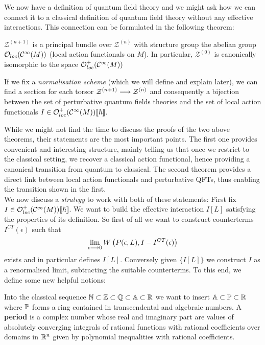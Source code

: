 We now have a definition of quantum field theory and we might ask how we can connect it to a classical definition of quantum field theory without any effective interactions. This connection can be formulated in the following theorem:

\begin{theo}
  $\mathcal{Z}^{(n+1)}$ is a principal bundle over $\mathcal{Z}^{(n)}$ with structure group the abelian group $\mathcal{O}_{loc}(\mathcal{C}^{\infty}(M))$ (local action functionals on $M$). In particular, $\mathcal{Z}^{(0)}$ is canonically isomorphic to the space $\mathcal{O}^+_{loc}(\mathcal{C}^{\infty}(M))$
\end{theo}

\begin{theo}
  If we fix a \emph{normalisation scheme} (which we will define and explain later), we can find a section for each torsor $\mathcal{Z}^{(n+1)} \longrightarrow \mathcal{Z}^{(n)}$ and consequently a bijection between the set of perturbative quantum fields theories and the set of local action functionals $I \in \mathcal{O}^+_{loc}(\mathcal{C}^{\infty}(M))\llbracket \hbar \rrbracket$.
\end{theo}

While we might not find the time to discuss the proofs of the two above theorems, their statements are the most important points. The first one provides convenient and interesting structure, mainly telling us that once we restrict to the classical setting, we recover a classical action functional, hence providing a canonical transition from quantum to classical. The second theorem provides a direct link between local action functionals and perturbative QFTs, thus enabling the transition shown in the first.\\

We now discuss a \textit{strategy} to work with both of these statements: First fix $I \in \mathcal{O}^+_{loc}(\mathcal{C}^{\infty}(M))\llbracket \hbar \rrbracket$. We want to build the effective interaction $I[L]$ satisfying the properties of its definition. So first of all we want to construct counterterms $I^{CT}(\epsilon)$ such that
\begin{equation} \lim_{\epsilon \lra 0} W\left(P(\epsilon,L), I-I^{CT}(\epsilon)\right)\end{equation}
exists and in particular defines $I[L]$. Conversely given $\{I[L]\}$ we construct $I$ as a renormalised limit, subtracting the suitable counterterms. To this end, we define some new helpful notions:

\begin{definition}[Periods]
  Into the classical sequence $\mathbb{N} \subset \mathbb{Z} \subset \mathbb{Q} \subset \mathbb{A} \subset \mathbb{R}$ we want to insert $\mathbb{A} \subset \mathbb{P} \subset \mathbb{R}$ where $\mathbb{P}$ forms a ring contained in transcendental and algebraic numbers. A \textbf{period} is a complex number whose real and imaginary part are values of absolutely converging integrals of rational functions with rational coefficients over domains in $\mathbb{R}^n$ given by polynomial inequalities with rational coefficients.
\end{definition}


